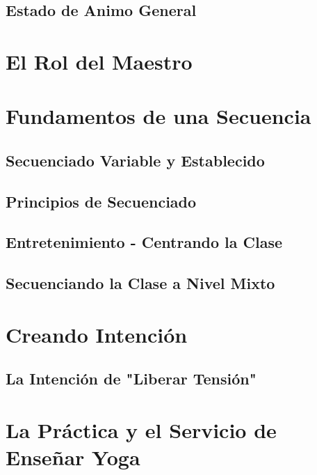 \subsection{Estado de Animo General}
\section{El Rol del Maestro}
\section{Fundamentos de una Secuencia}
\label{sec:fundSec}
\subsection{Secuenciado Variable y Establecido}
\subsection{Principios de Secuenciado}
\subsection{Entretenimiento - Centrando la Clase}
\subsection{Secuenciando la Clase a Nivel Mixto}
\section{Creando Intención}
\subsection{La Intención de "Liberar Tensión"}
\section{La Práctica y el Servicio de Enseñar Yoga}


